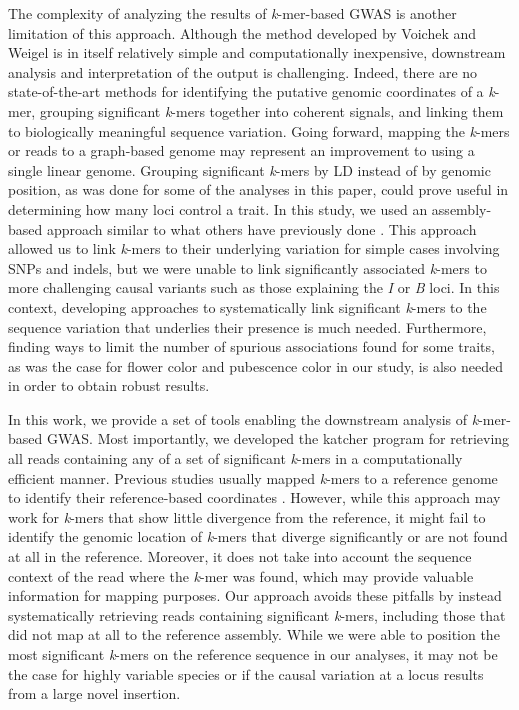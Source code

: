 \documentclass{article}
\begin{document}
The complexity of analyzing the results of \emph{k}-mer-based GWAS is another
limitation of this approach. Although the method developed by
Voichek and Weigel \cite{voichek2020} is in itself relatively simple and computationally
inexpensive, downstream analysis and interpretation of the output is
challenging. Indeed, there are no state-of-the-art methods for identifying the
putative genomic coordinates of a \emph{k}-mer, grouping significant
\emph{k}-mers together into coherent signals, and linking them to biologically
meaningful sequence variation. Going forward, mapping the \emph{k}-mers or
reads to a graph-based genome \citep[e.g. using the vg toolkit;][]{siren2021}
may represent an improvement to using a single linear genome.  Grouping
significant \emph{k}-mers by LD instead of by genomic position, as was done for
some of the analyses in this paper, could prove useful in determining how many
loci control a trait. In this study, we used an assembly-based approach similar
to what others have previously done \citep[e.g.][]{voichek2020, rahman2018}.
This approach allowed us to link \emph{k}-mers to their underlying variation
for simple cases involving SNPs and indels, but we were unable to link
significantly associated \emph{k}-mers to more challenging causal variants such
as those explaining the \emph{I} or \emph{B} loci. In this context, developing
approaches to systematically link significant \emph{k}-mers to the sequence
variation that underlies their presence is much needed. Furthermore, finding
ways to limit the number of spurious associations found for some traits, as was
the case for flower color and pubescence color in our study, is also needed in
order to obtain robust results.

In this work, we provide a set of tools enabling the downstream analysis of
\emph{k}-mer-based GWAS. Most importantly, we developed the katcher program for
retrieving all reads containing any of a set of significant \emph{k}-mers in a
computationally efficient manner. Previous studies usually mapped \emph{k}-mers
to a reference genome to identify their reference-based coordinates
\citep[e.g.][]{voichek2020, he2021, rahman2018, tripodi2021}.  However, while
this approach may work for \emph{k}-mers that show little divergence from the
reference, it might fail to identify the genomic location of \emph{k}-mers that
diverge significantly or are not found at all in the reference. Moreover, it
does not take into account the sequence context of the read where the
\emph{k}-mer was found, which may provide valuable information for mapping
purposes. Our approach avoids these pitfalls by instead systematically
retrieving reads containing significant \emph{k}-mers, including those that did
not map at all to the reference assembly. While we were able to position the
most significant \emph{k}-mers on the reference sequence in our analyses, it
may not be the case for highly variable species or if the causal variation at a
locus results from a large novel insertion.
\end{document}
